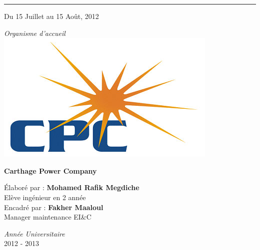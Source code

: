 \begin{center}
\vspace{2mm}
\hrule
\begin{flushright}\small {Du 15 Juillet au 15 Août, 2012} \hspace{2.6cm}\\[5mm]\end{flushright}
\vspace{20pt}
\large \emph {Organisme d'accueil}\\
\vspace{10pt}
\hspace{20pt}
\includegraphics[scale=0.3]{./Figures/logo_CPC.jpg}\\
\normalsize
\vspace{20pt}

\textbf{Carthage Power Company}
\vspace{2cm}

\begin{flushleft}
\normalsize
Élaboré par :
\textbf{Mohamed Rafik Megdiche}\\
\hspace{2.6cm}\small{Elève ingénieur en 2  année}\\[3mm]
\normalsize
Encadré par :
\textbf {Fakher Maaloul }\\
\hspace{2.7cm}\small  {Manager maintenance EI\&C}\\[1mm]

\end{flushleft}
\vspace{1.6cm}
\normalsize
\emph {Année Universitaire}\\
2012 - 2013\\
\end{center}